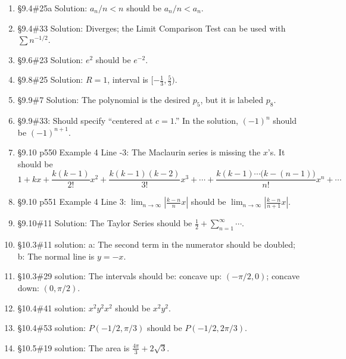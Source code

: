 \documentclass{amsart}
\newcommand{\ds}{\displaystyle}
\newcommand{\abs}[1]{\left\lvert#1\right\rvert}
\begin{document}
\begin{enumerate}
\item \S9.4\#25a Solution: $a_n/n<n$ should be $a_n/n<a_n$.
\item \S9.4\#33 Solution: Diverges; the Limit Comparison Test can be used with $\sum n^{-1/2}$.
\item \S9.6\#23 Solution: $e^2$ should be $e^{-2}$.
\item \S9.8\#25 Solution: $R=1$, interval is $[-\frac13,\frac53)$.
\item \S9.9\#7 Solution: The polynomial is the desired $p_5$, but it is labeled $p_8$.
\item \S9.9\#33: Should specify ``centered at $c=1$.''  In the solution, $(-1)^n$ should be $(-1)^{n+1}$.
\item \S9.10 p550 Example 4 Line -3: The Maclaurin series is missing the $x$'s.  It should be
\[
1+ kx + \frac{k(k-1)}{2!}x^2 + \frac{k(k-1)(k-2)}{3!}x^3 + \dotsb + \frac{k(k-1)\dotsm\big(k-(n-1)\big)}{n!}x^n+\dotsb
\]
\item \S9.10 p551 Example 4 Line 3: $\ds\lim_{n\to\infty} \abs{\frac{k-n}{n}x}$ should be $\ds\lim_{n\to\infty} \abs{\frac{k-n}{n+1}x}$.
\item \S9.10\#11 Solution: The Taylor Series should be $\frac12+\sum_{n=1}^\infty\dotsb$.
\item \S10.3\#11 solution: a: The second term in the numerator should be doubled; b: The normal line is $y=-x$.
\item \S10.3\#29 solution: The intervals should be: concave up: $(-\pi/2,0)$; concave down: $(0,\pi/2)$.
\item \S10.4\#41 solution: $x^2y^2x^2$ should be $x^2y^2$.
\item \S10.4\#53 solution: $P(-1/2,\pi/3)$ should be $P(-1/2,2\pi/3)$.
\item \S10.5\#19 solution: The area is $\frac{4\pi}{3}+2\sqrt 3$.
\label{2017-07-27IIplus}
\end{enumerate}


\clearpage
\end{document}
